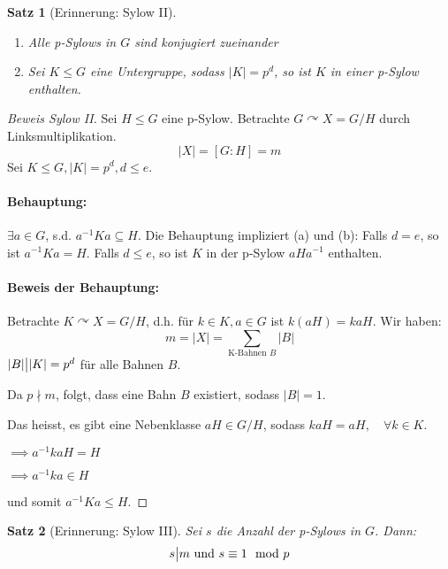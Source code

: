 \documentclass{article}
\theoremstyle{plain}
\newtheorem{theorem}{Satz}
\newcommand{\ug}{\leq}
\newcommand{\teilt}{\big{|}}
\newcommand{\operateson}{\curvearrowright}
\begin{document}
\begin{theorem}[Erinnerung: Sylow II]
    \quad
    \begin{enumerate}[label=(\alph*)]
        \item Alle p-Sylows in $G$ sind konjugiert zueinander
        \item Sei $K\ug G$ eine Untergruppe, sodass $|K|=p^d$, so ist $K$ in einer p-Sylow enthalten.
    \end{enumerate}
\end{theorem}

\begin{proof}[Beweis Sylow II]
    Sei $H\ug G$ eine p-Sylow. Betrachte $G\operateson X=G/H$ durch Linksmultiplikation.
    $$|X|=[G:H]=m$$
    Sei $K\ug G, |K|=p^d, d\leq e$.
    \paragraph{Behauptung:}$\exists a\in G$, s.d. $a^{-1}Ka\subseteq H$. 
    Die Behauptung impliziert (a) und (b):
    Falls $d=e$, so ist $a^{-1}Ka=H$.
    Falls $d\leq e$, so ist $K$ in der p-Sylow $aHa^{-1}$ enthalten.
    \paragraph{Beweis der Behauptung:} Betrachte $K\operateson X=G/H$, d.h. für $k\in K, a\in G$ ist $k(aH)=kaH$.
    Wir haben:
    $$m=|X|=\sum\limits_{\text{K-Bahnen }B}|B|$$
    $|B| \teilt |K|=p^d$ für alle Bahnen $B$.
    
    Da $p\nmid m$, folgt, dass eine Bahn $B$ existiert, sodass $|B|=1$.
    
    Das heisst, es gibt eine Nebenklasse $aH\in G/H$, sodass $kaH=aH,\quad\forall k\in K$.
    
    $\implies a^{-1}kaH=H$

    $\implies a^{-1}ka\in H$

    und somit $a^{-1}Ka\ug H$.
\end{proof}

\begin{theorem}[Erinnerung: Sylow III]
    Sei $s$ die Anzahl der p-Sylows in $G$. Dann:
    $$s\teilt m \text{ und } s\equiv 1\mod p$$
\end{theorem}
\end{document}

